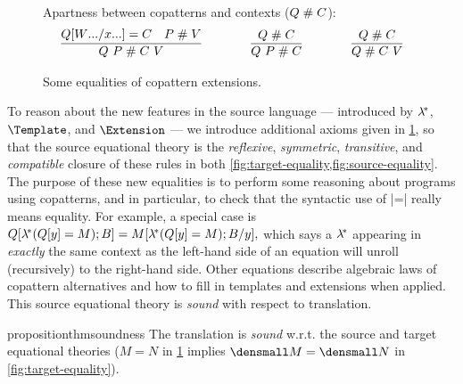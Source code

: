 \begin{figure}[t!]
Apartness between copatterns and contexts ($Q \apart C$):
\begin{gather*}
  \infer
  {Q ~ P \apart C ~ V}
  {Q\subst{\many{x}}{\many{W}} = C & P \apart V}
  \qqqquad
  \infer
  {Q ~ P \apart C}
  {Q \apart C}
  \qqqquad
  \infer
  {Q \apart C ~ V}
  {Q \apart C}
\end{gather*}

\caption{Some equalities of copattern extensions.}
\label{fig:source-equality}
\end{figure}

To reason about the new features in the source language --- introduced by $\lamstar$, $\Template$, and $\Extension$ --- we introduce additional axioms given in \cref{fig:source-equality}, so that the source equational theory is the \emph{reflexive}, \emph{symmetric}, \textit{transitive}, and \emph{compatible} closure of these rules in both \cref{fig:target-equality,fig:source-equality}.
The purpose of these new equalities is to perform some reasoning about programs using copatterns, and in particular, to check that the syntactic use of \scm|=| really means equality.
For example, a special case is
\begin{math}
  Q[\lamstar(Q[y] = M); B] = M\subst{y}{\lamstar(Q[y]=M);B}
  ,
\end{math}
which says a $\lamstar$ appearing in \emph{exactly} the same context as the left-hand side of an equation will unroll (recursively) to the right-hand side.
Other equations describe algebraic laws of copattern alternatives and how to fill in templates and extensions when applied.
This source equational theory is \emph{sound} with respect to translation.

\begin{restatable}[Soundness]{proposition}{thmsoundness}
  \label{thm:soundness}
  The translation is \emph{sound} w.r.t. the source and target equational theories (\eg $M = N$ in \cref{fig:source-equality} implies $\den{M} = \den{N}$ in \cref{fig:target-equality}).
\end{restatable}


